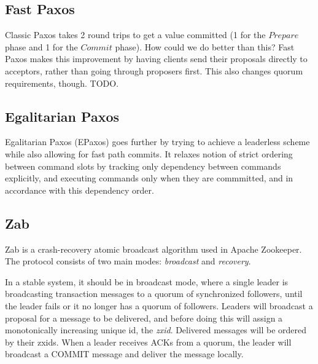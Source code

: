 \documentclass[10pt,a4paper]{article}
\begin{document}
\subsection{Fast Paxos}

Classic Paxos takes 2 round trips to get a value committed (1 for the $Prepare$ phase and 1 for the $Commit$ phase). How could we do better than this? Fast Paxos \cite{lamport2006fast} makes this improvement by having clients send their proposals directly to acceptors, rather than going through proposers first. This also changes quorum requirements, though. TODO.

\subsection{Egalitarian Paxos}

Egalitarian Paxos (EPaxos) \cite{2013epaxosmoraru} goes further by trying to achieve a leaderless scheme while also allowing for fast path commits. It relaxes notion of strict ordering between command slots by tracking only dependency between commands explicitly, and executing commands only when they are commmitted, and in accordance with this dependency order.

\subsection{Zab}

Zab \cite{2011zab,2008zabsimple} is a crash-recovery atomic broadcast algorithm used in Apache Zookeeper. The protocol consists of two main modes: \textit{broadcast} and \textit{recovery}. 

In a stable system, it should be in broadcast mode, where a single leader is broadcasting transaction messages to a quorum of synchronized followers, until the leader fails or it no longer has a quorum of followers. Leaders will broadcast a proposal for a message to be delivered, and before doing this will assign a monotonically increasing unique id,  the \textit{zxid}. Delivered messages will be ordered by their zxids. When a leader receives ACKs from a quorum, the leader will broadcast a \textsc{COMMIT} message and deliver the message locally.
\end{document}
